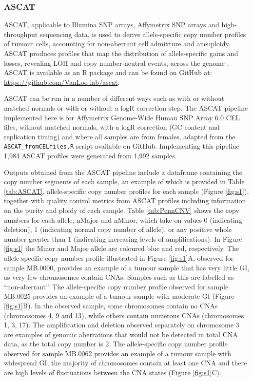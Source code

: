 \subsubsection{ASCAT}
ASCAT, applicable to Illumina SNP arrays, Affymetrix SNP arrays and high-throughput sequencing data, is used to derive allele-specific copy number profiles of tumour cells, accounting for non-aberrant cell admixture and aneuploidy. ASCAT produces profiles that map the distribution of allele-specific gains and losses, revealing LOH and copy number-neutral events, across the genome \citep{pmid20837533}. ASCAT is available as an R package and can be found on GitHub at: \href{https://github.com/VanLoo-lab/ascat}{https://github.com/VanLoo-lab/ascat}.  

ASCAT can be run in a number of different ways such as with or without matched normals or with or without a logR correction step. The ASCAT pipeline implemented here is for Affymetrix Genome-Wide Human SNP Array 6.0 CEL files, without matched normals, with a logR correction (GC content and replication timing) and where all samples are from females, adapted from the \texttt{ASCAT\_fromCELfiles.R} script available on GitHub. Implementing this pipeline 1,984 ASCAT profiles were generated from 1,992 samples. 

Outputs obtained from the ASCAT pipeline include a dataframe containing the copy number segments of each sample, an example of which is provided in Table \ref{tab:ASCAT}, allele-specific copy number profiles for each sample (Figure \ref{fig:s1}), together with quality control metrics from ASCAT profiles including information on the purity and ploidy of each sample. Table \ref{tab:PennCNV} shows the copy numbers for each allele, nMajor and nMinor, which take on values 0 (indicating deletion), 1 (indicating normal copy number of allele), or any positive whole number greater than 1 (indicating increasing levels of amplifications). In Figure \ref{fig:s1} the Minor and Major allele are coloured blue and red, respectively. The allele-specific copy number profile illustrated in Figure \ref{fig:s1}A, observed for sample MB.0000, provides an example of a tumour sample that has very little GI, as very few chromosomes contain CNAs. Samples such as this are labelled as “non-aberrant”. The allele-specific copy number profile observed for sample MB.0025 provides an example of a tumour sample with moderate GI (Figure \ref{fig:s1}B). In the observed sample, some chromosomes contain no CNAs (chromosomes 4, 9 and 13), while others contain numerous CNAs (chromosomes 1, 3, 17). The amplification and deletion observed separately on chromosome 3 are examples of genomic aberrations that would not be detected in total CNA data, as the total copy number is 2. The allele-specific copy number profile observed for sample MB.0062 provides an example of a tumour sample with widespread GI, the majority of chromosomes contain at least one CNA and there are high levels of fluctuations between the CNA states (Figure \ref{fig:s1}C).


